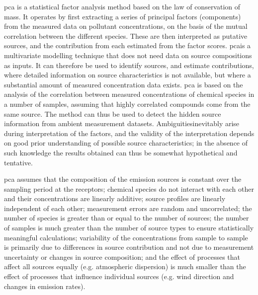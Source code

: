 \documentclass{nwureport}
\begin{document}
\gls{pca} is a statistical factor analysis method based on the law of conservation
of mass. It operates by first extracting a series of principal factors (components) from the measured data on
pollutant concentrations, on the basis of the mutual correlation between the different species. These are
then interpreted as putative sources, and the contribution from each estimated from the factor scores.
\gls{pca}is a multivariate modelling technique that does not need data on source compositions as inputs. It can
therefore be used to identify sources, and estimate contributions, where detailed information on source
characteristics is not available, but where a substantial amount of measured concentration data exists.
\gls{pca} is based on the analysis of the correlation between measured concentrations of chemical species in a
number of samples, assuming that highly correlated compounds come from the same source. The method
can thus be used to detect the hidden source information from ambient measurement datasets. Ambiguitiesinevitably arise during interpretation of the factors, and the validity of the interpretation depends on good
prior understanding of possible source characteristics; in the absence of such knowledge the results
obtained can thus be somewhat hypothetical and tentative.

\gls{pca} assumes that the composition of the emission sources is constant over the sampling period at the
receptors; chemical species do not interact with each other and their concentrations are linearly additive;
source profiles are linearly independent of each other; measurement errors are random and uncorrelated;
the number of species is greater than or equal to the number of sources; the number of samples is much
greater than the number of source types to ensure statistically meaningful calculations; variability of the
concentrations from sample to sample is primarily due to differences in source contribution and not due to
measurement uncertainty or changes in source composition; and the effect of processes that affect all
sources equally (e.g. atmospheric dispersion) is much smaller than the effect of processes that influence
individual sources (e.g. wind direction and changes in emission rates).
\end{document}
